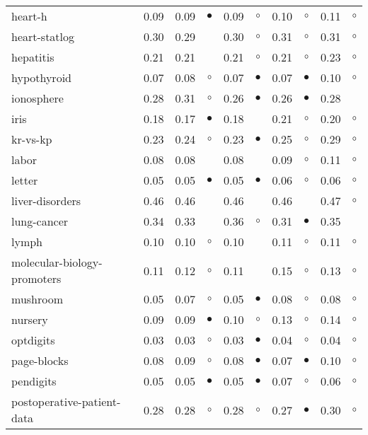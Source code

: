 {\begin{longtable}{lrr@{\hspace{0.1cm}}cr@{\hspace{0.1cm}}cr@{\hspace{0.1cm}}cr@{\hspace{0.1cm}}c}
heart-h & 0.09 & 0.09 &  $\bullet$ & 0.09 &    $\circ$ & 0.10 &   $\circ$ & 0.11 &   $\circ$\\
heart-statlog & 0.30 & 0.29 &            & 0.30 &    $\circ$ & 0.31 &   $\circ$ & 0.31 &   $\circ$\\
hepatitis & 0.21 & 0.21 &            & 0.21 &    $\circ$ & 0.21 &   $\circ$ & 0.23 &   $\circ$\\
hypothyroid & 0.07 & 0.08 &    $\circ$ & 0.07 &  $\bullet$ & 0.07 & $\bullet$ & 0.10 &   $\circ$\\
ionosphere & 0.28 & 0.31 &    $\circ$ & 0.26 &  $\bullet$ & 0.26 & $\bullet$ & 0.28 &          \\
iris & 0.18 & 0.17 &  $\bullet$ & 0.18 &            & 0.21 &   $\circ$ & 0.20 &   $\circ$\\
kr-vs-kp & 0.23 & 0.24 &    $\circ$ & 0.23 &  $\bullet$ & 0.25 &   $\circ$ & 0.29 &   $\circ$\\
labor & 0.08 & 0.08 &            & 0.08 &            & 0.09 &   $\circ$ & 0.11 &   $\circ$\\
letter & 0.05 & 0.05 &  $\bullet$ & 0.05 &  $\bullet$ & 0.06 &   $\circ$ & 0.06 &   $\circ$\\
liver-disorders & 0.46 & 0.46 &            & 0.46 &            & 0.46 &           & 0.47 &   $\circ$\\
lung-cancer & 0.34 & 0.33 &            & 0.36 &    $\circ$ & 0.31 & $\bullet$ & 0.35 &          \\
lymph & 0.10 & 0.10 &    $\circ$ & 0.10 &            & 0.11 &   $\circ$ & 0.11 &   $\circ$\\
molecular-biology-promoters & 0.11 & 0.12 &    $\circ$ & 0.11 &            & 0.15 &   $\circ$ & 0.13 &   $\circ$\\
mushroom & 0.05 & 0.07 &    $\circ$ & 0.05 &  $\bullet$ & 0.08 &   $\circ$ & 0.08 &   $\circ$\\
nursery & 0.09 & 0.09 &  $\bullet$ & 0.10 &    $\circ$ & 0.13 &   $\circ$ & 0.14 &   $\circ$\\
optdigits & 0.03 & 0.03 &    $\circ$ & 0.03 &  $\bullet$ & 0.04 &   $\circ$ & 0.04 &   $\circ$\\
page-blocks & 0.08 & 0.09 &    $\circ$ & 0.08 &  $\bullet$ & 0.07 & $\bullet$ & 0.10 &   $\circ$\\
pendigits & 0.05 & 0.05 &  $\bullet$ & 0.05 &  $\bullet$ & 0.07 &   $\circ$ & 0.06 &   $\circ$\\
postoperative-patient-data & 0.28 & 0.28 &    $\circ$ & 0.28 &    $\circ$ & 0.27 & $\bullet$ & 0.30 &   $\circ$\\

\end{longtable}}
